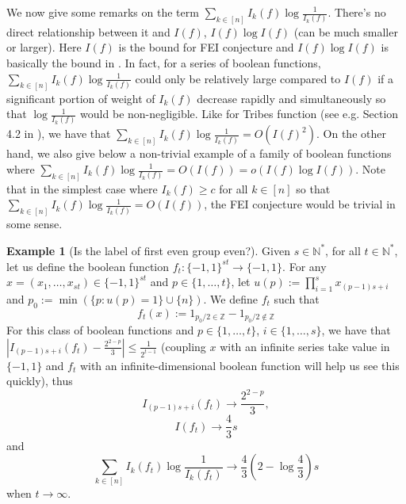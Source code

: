 \documentclass[10pt]{article} \usepackage[utf8]{inputenc}
\theoremstyle{definition}
\newtheorem{exmp}{Example}[section]
\theoremstyle{remark}
\numberwithin{equation}{section}
\begin{document}
We now give some remarks on the term $\sum\limits_{k\in[n]}I_k(f)\log \frac{1}{I_k(f)}$. There's no direct relationship between it and $I(f)$, $I(f)\log I(f)$ (can be much smaller or larger). Here $I(f)$ is the bound for FEI conjecture and $I(f)\log I(f)$ is basically the bound in \cite{1}. In fact, for a series of boolean functions, $\sum\limits_{k\in[n]}I_k(f)\log \frac{1}{I_k(f)}$ could only be relatively large compared to $I(f)$ if a significant portion of weight of $I_k(f)$ decrease rapidly and simultaneously so that $\log \frac{1}{I_k(f)}$ would be non-negligible. Like for Tribes function (see e.g. Section 4.2 in \cite{2}), we have that $\sum\limits_{k\in[n]}I_k(f)\log \frac{1}{I_k(f)}= O(I(f)^2)$. On the other hand, we also give below a non-trivial example of a family of boolean functions where $\sum\limits_{k\in[n]}I_k(f)\log \frac{1}{I_k(f)}=O(I(f))=o(I(f)\log I(f))$. Note that in the simplest case where $I_k(f)\geq c$ for all $k\in [n]$ so that $\sum\limits_{k\in[n]}I_k(f)\log \frac{1}{I_k(f)}=O(I(f))$, the FEI conjecture would be trivial in some sense. 
\begin{exmp}[Is the label of first even group even?]
Given $s\in \mathbb{N}^*$, for all $t\in \mathbb{N}^*$, let us define the boolean function $f_t:\{-1,1\}^{st}\to \{-1,1\}$. For any $x=(x_1,\dots,x_{st})\in \{-1,1\}^{st}$ and $p\in\{1,\dots,t\}$, let $u(p):=\prod\limits_{i=1}^{s} x_{(p-1)s+i}$ and $p_0:=\min(\{p:u(p)=1\} \cup \{n\})$. We define $f_t$ such that 
\begin{equation}
f_t(x):= 1_{p_0/2 \in \mathbb {Z}}- 1_{p_0/2 \notin \mathbb {Z}}
\end{equation}
For this class of boolean functions and $p\in\{1,\dots,t\}$, $i\in \{1,\dots,s\}$, we have that $|I_{(p-1)s+i}(f_t)-\frac{2^{2-p}}{3}|\leq \frac{1}{2^{t-1}}$ (coupling $x$ with an infinite series take value in $\{-1,1\}$ and $f_t$ with an infinite-dimensional boolean function will help us see this quickly), thus
$$I_{(p-1)s+i}(f_t) \to \frac{2^{2-p}}{3},$$ $$I(f_t)\to \frac{4}{3} s$$  and 
$$\sum_{k\in[n]}I_k(f_t)\log\frac{1}{I_k(f_t)} \to \frac{4}{3}(2-\log\frac{4}{3}) s$$
when $t \to \infty$. 
\end{exmp}
\end{document}
